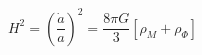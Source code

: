 \begin{equation}
H^{2}=(\frac{\dot{a}}{a})^{2}=\frac{8\pi
G}{3}[\rho_{M}+\rho_{\Phi}]
\end{equation}

